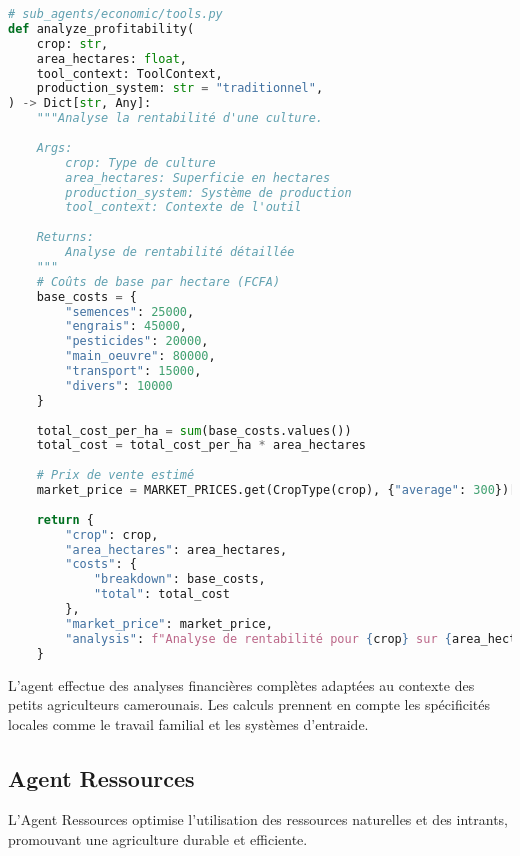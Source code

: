  
\begin{lstlisting}[language=Python, caption=Analyse économique]
# sub_agents/economic/tools.py
def analyze_profitability(
    crop: str,
    area_hectares: float,
    tool_context: ToolContext,
    production_system: str = "traditionnel",
) -> Dict[str, Any]:
    """Analyse la rentabilité d'une culture.
    
    Args:
        crop: Type de culture
        area_hectares: Superficie en hectares
        production_system: Système de production
        tool_context: Contexte de l'outil
        
    Returns:
        Analyse de rentabilité détaillée
    """
    # Coûts de base par hectare (FCFA)
    base_costs = {
        "semences": 25000,
        "engrais": 45000,
        "pesticides": 20000,
        "main_oeuvre": 80000,
        "transport": 15000,
        "divers": 10000
    }
    
    total_cost_per_ha = sum(base_costs.values())
    total_cost = total_cost_per_ha * area_hectares
    
    # Prix de vente estimé
    market_price = MARKET_PRICES.get(CropType(crop), {"average": 300})["average"]
    
    return {
        "crop": crop,
        "area_hectares": area_hectares,
        "costs": {
            "breakdown": base_costs,
            "total": total_cost
        },
        "market_price": market_price,
        "analysis": f"Analyse de rentabilité pour {crop} sur {area_hectares} ha"
    }
\end{lstlisting}

L'agent effectue des analyses financières complètes adaptées au contexte des petits agriculteurs camerounais. Les calculs prennent en compte les spécificités locales comme le travail familial et les systèmes d'entraide.

\subsection{Agent Ressources}

L'Agent Ressources optimise l'utilisation des ressources naturelles et des intrants, promouvant une agriculture durable et efficiente.

